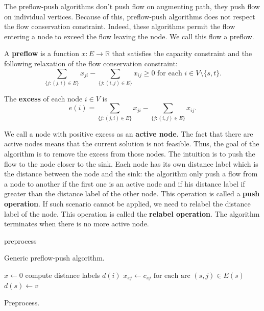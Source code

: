 The preflow-push algorithms don't push flow on augmenting path, they push flow on individual vertices. Because of this, preflow-push algorithms does not respect the flow conservation constraint. Indeed, these algorithms permit the flow entering a node to exceed the flow leaving the node. We call this flow a preflow.

\begin{definition}
\label{preflow}
A \textbf{preflow} is a function $x: E \to \mathbb{R}$ that satisfies the capacity constraint and the following relaxation of the flow conservation constraint:
$$\sum\limits_{\{j : (j,i) \in E\}} x_{ji} - \sum\limits_{\{j : (i,j) \in E\}} x_{ij} \geq 0 \text{	for each } i \in V \setminus \{s, t\}.$$
\end{definition}

\begin{definition}
\label{excess}
The \textbf{excess} of each node $i \in V$ is 
$$e(i) = \sum\limits_{\{j : (j,i) \in E\}} x_{ji} - \sum\limits_{\{j : (i,j) \in E\}} x_{ij}.$$
\end{definition}

We call a node with positive excess as an \textbf{active node}. The fact that there are active nodes means that the current solution is not feasible. Thus, the goal of the algorithm is to remove the excess from those nodes. The intuition is to push the flow to the node closer to the sink. Each node has its own distance label which is the distance between the node and the sink: the algorithm only push a flow from a node to another if the first one is an active node and if his distance label if greater than the distance label of the other node. This operation is called a \textbf{push operation}. If such scenario cannot be applied, we need to relabel the distance label of the node. This operation is called the \textbf{relabel operation}. The algorithm terminates when there is no more active node.

\begin{algorithm}
 preprocess\;
\caption{Generic preflow-push algorithm.}
\end{algorithm}

\begin{algorithm}
 $x\gets 0$\;
 compute distance labels $d(i)$\;
 $x_{sj}\gets c_{sj} \text{ for each arc } (s, j) \in E(s)$\;
 $d(s)\gets v$\;
\caption{Preprocess.}
\end{algorithm}

